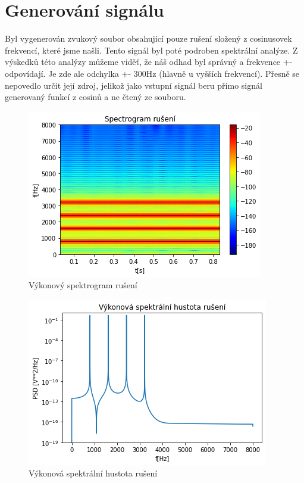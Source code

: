 \documentclass{article}
\begin{document}
\section{Generování signálu}
Byl vygenerován zvukový soubor obsahující pouze rušení složený z cosinusovek frekvencí, které jsme našli. Tento signál byl poté podroben spektrální analýze.
Z výskedků této analýzy můžeme viděť, že náš odhad byl správný a frekvence +- odpovídají. Je zde ale odchylka +- 300Hz (hlavně u vyšších frekvencí). Přesně se nepovedlo určit její zdroj, jelikož jako vstupní signál beru přímo signál generovaný funkcí z cosinů a ne čtený ze souboru.

\begin{figure}[H] 
	\centering
	\includegraphics[scale=0.67,keepaspectratio]{Figure_8}
	\caption{Výkonový spektrogram rušení}
\end{figure}

\begin{figure}[H] 
	\centering
	\includegraphics[scale=0.67,keepaspectratio]{Figure_9}
	\caption{Výkonová spektrální hustota rušení}
\end{figure}
\end{document}
